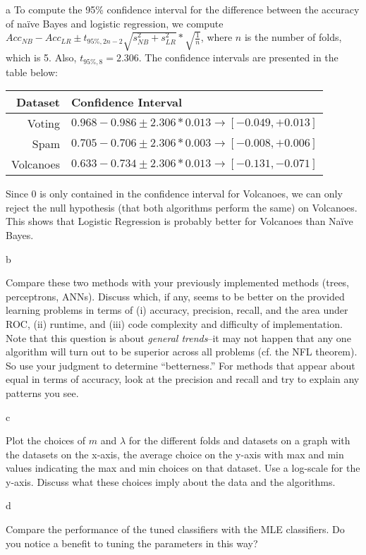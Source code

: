 \documentclass[fleqn]{homework}
\begin{document}
\begin{problem}{a}
    To compute the 95\% confidence interval for the difference between the
    accuracy of na\"ive Bayes and logistic regression, we compute
    $Acc_{NB} - Acc_{LR} \pm t_{95\%,2n-2} \sqrt{s_{NB}^2 + s_{LR}^2} *
    \sqrt{\frac{1}{n}}$,
    where $n$ is the number of folds, which is 5.  Also, $t_{95\%,8} = 2.306$.
    The confidence intervals are presented in the table below:

    \vspace{0.3cm}
    \begin{tabular}{rl}
      \hline
      Dataset & Confidence Interval \\
      \hline
      Voting & $0.968 - 0.986 \pm 2.306 * 0.013 \to [-0.049, +0.013]$ \\
      Spam & $0.705 - 0.706 \pm 2.306 * 0.003 \to [-0.008, +0.006]$ \\
      Volcanoes & $0.633 - 0.734 \pm 2.306 * 0.013 \to [-0.131, -0.071]$ \\
      \hline
    \end{tabular}
    \vspace{0.3cm}

    Since 0 is only contained in the confidence interval for Volcanoes, we can
    only reject the null hypothesis (that both algorithms perform the same) on
    Volcanoes.  This shows that Logistic Regression is probably better for
    Volcanoes than Na\"ive Bayes.

  \end{problem}

  \begin{problem}{b}
    \begin{question}
      Compare these two methods with your previously implemented methods (trees,
      perceptrons, ANNs).  Discuss which, if any, seems to be better on the
      provided learning problems in terms of (i) accuracy, precision, recall,
      and the area under ROC, (ii) runtime, and (iii) code complexity and
      difficulty of implementation.  Note that this question is about
      \textit{general trends}--it may not happen that any one algorithm will
      turn out to be superior across all problems (cf. the NFL theorem).  So use
      your judgment to determine ``betterness.''  For methods that appear about
      equal in terms of accuracy, look at the precision and recall and try to
      explain any patterns you see.
    \end{question}
  \end{problem}

  \begin{problem}{c}
    \begin{question}
      Plot the choices of $m$ and $\lambda$ for the different folds and datasets
      on a graph with the datasets on the x-axis, the average choice on the
      y-axis with max and min values indicating the max and min choices on that
      dataset.  Use a log-scale for the y-axis.  Discuss what these choices
      imply about the data and the algorithms.
    \end{question}
  \end{problem}

  \begin{problem}{d}
    \begin{question}
      Compare the performance of the tuned classifiers with the MLE classifiers.
      Do you notice a benefit to tuning the parameters in this way?
    \end{question}
  \end{problem}
\end{document}
